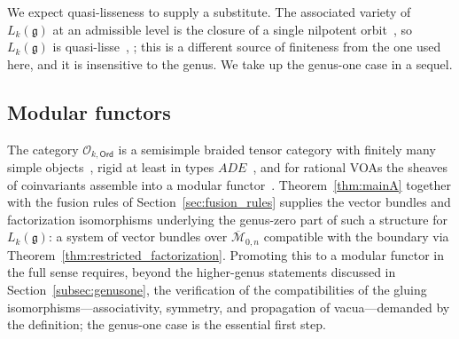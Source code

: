 \documentclass[12pt,a4paper,reqno]{amsart}
\numberwithin{equation}{section}
\theoremstyle{definition}
\newcommand{\g}{\mathfrak{g}}
\newcommand{\M}{\mathcal{M}}
\def\O{\mathcal{O}}
\def\Ord{\mathsf{Ord}}
\begin{document}
We expect quasi-lisseness to supply a substitute. The associated variety of $L_k(\g)$ at an admissible level is the closure of a single nilpotent orbit~\cite[Theorems 5.3.1 and 5.7.1]{A15}, so $L_k(\g)$ is quasi-lisse~\cite[Lemma 6.1]{AK18}, \cite{AvEM22}; this is a different source of finiteness from the one used here, and it is insensitive to the genus. We take up the genus-one case in a sequel.

\subsection{Modular functors}\label{subsec:modfunctor}
The category $\O_{k,\Ord}$ is a semisimple braided tensor category with finitely many simple objects~\cite{creutzig2018braided,A16}, rigid at least in types $ADE$~\cite{Creutzig19}, and for rational VOAs the sheaves of coinvariants assemble into a modular functor~\cite{damiolini2025modular}. Theorem~\ref{thm:mainA} together with the fusion rules of Section~\ref{sec:fusion_rules} supplies the vector bundles and factorization isomorphisms underlying the genus-zero part of such a structure for $L_k(\g)$: a system of vector bundles over $\overline{\M}_{0,n}$ compatible with the boundary via Theorem~\ref{thm:restricted_factorization}. Promoting this to a modular functor in the full sense requires, beyond the higher-genus statements discussed in Section~\ref{subsec:genusone}, the verification of the compatibilities of the gluing isomorphisms---associativity, symmetry, and propagation of vacua---demanded by the definition; the genus-one case is the essential first step.





\end{document}
